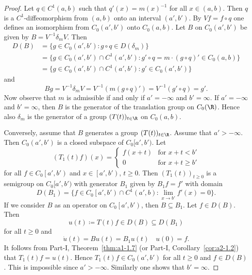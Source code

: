 \begin{proof}
Let $q \in C^{1}(a,b)$ such that $q'(x) = m(x)^{-1}$ for all $x \in (a,b)$.
Then $q$ is a $C^{1}$-diffeomorphism from $(a,b)$ onto an interval $(a',b')$.
By $Vf = f \circ q$ one defines an isomorphism from $C_{0}(a',b')$ onto $C_{0}(a,b)$.
Let $B$ on $C_{0}(a',b')$ be given by $B = V^{-1}\delta_{m}V$.
Then 
\begin{align*}
D(B) &= \{ g \in C_{0}(a',b') \colon g \circ q \in D(\delta_{m}) \} \\
&= \{ g \in C_{0}(a',b') \cap C^{1}(a',b') \colon g' \circ q 
= m \cdot (g \circ q)' \in C_{0}(a,b) \} \\
&= \{ g \in C_{0}(a',b') \cap C^{1}(a',b') \colon g' \in C_{0}(a',b') \}
\end{align*}
and 
%
\[
	Bg = V^{-1}\delta_{m}V = V^{-1}(m(g \circ q)') = V^{-1}(g' \circ q) = g'.
\]
%
Now observe that $m$ is admissible if and only if\/ $a' = -\infty$ and $b' = \infty$.
If\/ $a' = -\infty$ and $b' = \infty$, then $B$ is the generator of the translation group on $C_{0}(\R)$.
Hence also $\delta_{m}$ is the generator of a group $(T(t))_{t \in \R}$ on $C_{0}(a,b)$.

Conversely, assume that $B$ generates a group $(T(t))_{t \in \R}$.
Assume that $a' > -\infty$.
Then $C_{0}(a',b')$ is a closed subspace of\/ $C_{0}[a',b')$.
Let
\begin{equation*}\label{eq:b2-t1}
(T_{1}(t)f)(x) = \begin{cases}
    f(x+t) & \text{for } x+t < b' \\
    0 & \text{for } x+t \geq b'
\end{cases}
\end{equation*}
for all $f \in C_{0}\left[a',b'\right)$ and $x \in \left[a',b'\right)$, $t \geq 0$.
Then $(T_{1}(t))_{t \geq 0}$ is a semigroup on $C_{0}[a',b')$ with generator $B_{1}$ given by 
$B_{1}f = f'$ with domain 
\[
D(B_{1}) = \{ f \in C_{0}\left[a',b'\right) \cap C^{1}(a',b) \colon \lim_{x \to b'} f'(x) = 0 \}.
\]
If we consider $B$ as an operator on $C_{0}\left[a',b'\right)$, then $B \subseteq B_{1}$.
Let $f \in D(B)$.
Then 
%
\[
	 u(t) \coloneq T(t)f \in D(B) \subseteq D(B_{1}) 
\]
%
for all $t \geq 0$ and 
%
\[
	\dot{u}(t) = Bu(t) = B_{1}u(t) \quad u(0) = f.
\]
%
It follows from Part-I, Theorem~\ref{thm:a1-1.7} (or Part-I, Corollary~\ref{cor:a2-1.2})
that $T_{1}(t)f = u(t)$.
Hence $T_{1}(t)f \in C_{0}(a',b')$ for all $t \geq 0$ and $f \in D(B)$.
This is impossible since $a' > -\infty$.
Similarly one shows that $b' = \infty$.
\end{proof}
